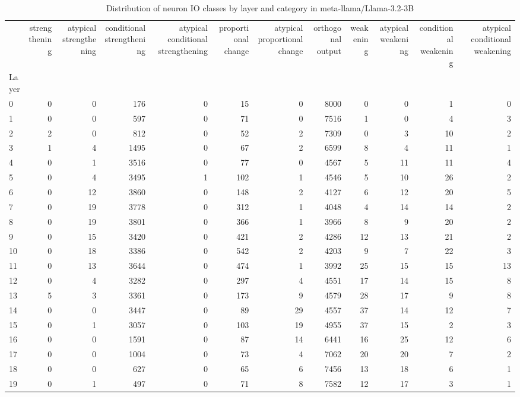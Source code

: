 \begin{table}
\caption{Distribution of neuron IO classes by layer and category in meta-llama/Llama-3.2-3B}
\label{tab:meta-llama/Llama-3.2-3B}
\begin{tabular}{lrrrrrrrrrrr}
 & strengthening & atypical strengthening & conditional strengthening & atypical conditional strengthening & proportional change & atypical proportional change & orthogonal output & weakening & atypical weakening & conditional weakening & atypical conditional weakening \\
Layer &  &  &  &  &  &  &  &  &  &  &  \\
0 & 0 & 0 & 176 & 0 & 15 & 0 & 8000 & 0 & 0 & 1 & 0 \\
1 & 0 & 0 & 597 & 0 & 71 & 0 & 7516 & 1 & 0 & 4 & 3 \\
2 & 2 & 0 & 812 & 0 & 52 & 2 & 7309 & 0 & 3 & 10 & 2 \\
3 & 1 & 4 & 1495 & 0 & 67 & 2 & 6599 & 8 & 4 & 11 & 1 \\
4 & 0 & 1 & 3516 & 0 & 77 & 0 & 4567 & 5 & 11 & 11 & 4 \\
5 & 0 & 4 & 3495 & 1 & 102 & 1 & 4546 & 5 & 10 & 26 & 2 \\
6 & 0 & 12 & 3860 & 0 & 148 & 2 & 4127 & 6 & 12 & 20 & 5 \\
7 & 0 & 19 & 3778 & 0 & 312 & 1 & 4048 & 4 & 14 & 14 & 2 \\
8 & 0 & 19 & 3801 & 0 & 366 & 1 & 3966 & 8 & 9 & 20 & 2 \\
9 & 0 & 15 & 3420 & 0 & 421 & 2 & 4286 & 12 & 13 & 21 & 2 \\
10 & 0 & 18 & 3386 & 0 & 542 & 2 & 4203 & 9 & 7 & 22 & 3 \\
11 & 0 & 13 & 3644 & 0 & 474 & 1 & 3992 & 25 & 15 & 15 & 13 \\
12 & 0 & 4 & 3282 & 0 & 297 & 4 & 4551 & 17 & 14 & 15 & 8 \\
13 & 5 & 3 & 3361 & 0 & 173 & 9 & 4579 & 28 & 17 & 9 & 8 \\
14 & 0 & 0 & 3447 & 0 & 89 & 29 & 4557 & 37 & 14 & 12 & 7 \\
15 & 0 & 1 & 3057 & 0 & 103 & 19 & 4955 & 37 & 15 & 2 & 3 \\
16 & 0 & 0 & 1591 & 0 & 87 & 14 & 6441 & 16 & 25 & 12 & 6 \\
17 & 0 & 0 & 1004 & 0 & 73 & 4 & 7062 & 20 & 20 & 7 & 2 \\
18 & 0 & 0 & 627 & 0 & 65 & 6 & 7456 & 13 & 18 & 6 & 1 \\
19 & 0 & 1 & 497 & 0 & 71 & 8 & 7582 & 12 & 17 & 3 & 1 \\

\end{tabular}
\end{table}
